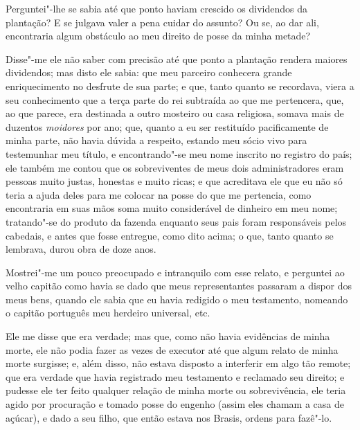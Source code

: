 Perguntei"-lhe se sabia até que ponto haviam crescido os dividendos da
plantação? E se julgava valer a pena cuidar do assunto? Ou se, ao dar
ali, encontraria algum obstáculo ao meu direito de posse da minha
metade?

Disse"-me ele não saber com precisão até que ponto a plantação rendera
maiores dividendos; mas disto ele sabia: que meu parceiro conhecera
grande enriquecimento no desfrute de sua parte; e que, tanto quanto se
recordava, viera a seu conhecimento que a terça parte do rei subtraída
ao que me pertencera, que, ao que parece, era destinada a outro mosteiro
ou casa religiosa, somava mais de duzentos \emph{moidores} por ano; que,
quanto a eu ser restituído pacificamente de minha parte, não havia
dúvida a respeito, estando meu sócio vivo para testemunhar meu título, e
encontrando"-se meu nome inscrito no registro do país; ele também me
contou que os sobreviventes de meus dois administradores eram pessoas
muito justas, honestas e muito ricas; e que acreditava ele que eu não só
teria a ajuda deles para me colocar na posse do que me pertencia, como
encontraria em suas mãos soma muito considerável de dinheiro em meu
nome; tratando"-se do produto da fazenda enquanto seus pais foram
responsáveis pelos cabedais, e antes que fosse entregue, como dito
acima; o que, tanto quanto se lembrava, durou obra de doze anos.

Mostrei"-me um pouco preocupado e intranquilo com esse relato, e
perguntei ao velho capitão como havia se dado que meus representantes
passaram a dispor dos meus bens, quando ele sabia que eu havia redigido
o meu testamento, nomeando o capitão português meu herdeiro universal,
etc.

Ele me disse que era verdade; mas que, como não havia evidências de
minha morte, ele não podia fazer as vezes de executor até que algum
relato de minha morte surgisse; e, além disso, não estava disposto a
interferir em algo tão remote; que era verdade que havia registrado meu
testamento e reclamado seu direito; e pudesse ele ter feito qualquer
relação de minha morte ou sobrevivência, ele teria agido por procuração
e tomado posse do engenho (assim eles chamam a casa de açúcar), e dado a
seu filho, que então estava nos Brasis, ordens para fazê"-lo.



